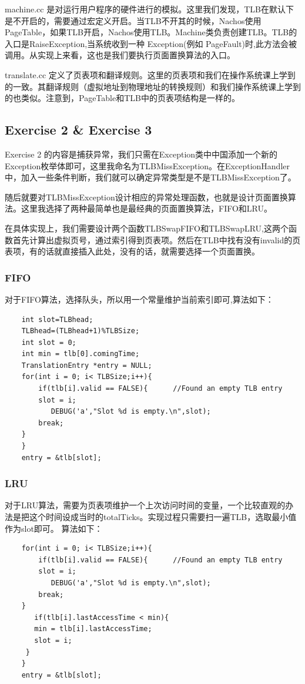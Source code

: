 \documentclass[nofonts]{ctexart}
\begin{document}
machine.cc 是对运行用户程序的硬件进行的模拟。这里我们发现，TLB在默认下是不开启的，需要通过宏定义开启。当TLB不开其的时候，Nachos使用PageTable，如果TLB开启，Nachos使用TLB。Machine类负责创建TLB。TLB的入口是RaiseException,当系统收到一种 Exception(例如 PageFault)时,此方法会被调用。从实现上来看，这也是我们要执行页面置换算法的入口。

translate.cc 定义了页表项和翻译规则。这里的页表项和我们在操作系统课上学到的一致。其翻译规则（虚拟地址到物理地址的转换规则）和我们操作系统课上学到的也类似。注意到，PageTable和TLB中的页表项结构是一样的。

\subsection*{Exercise 2 \& Exercise 3}

Exercise 2 的内容是捕获异常，我们只需在Exception类中中国添加一个新的Exception枚举体即可，这里我命名为TLBMissException。在ExceptionHandler中，加入一些条件判断，我们就可以确定异常类型是不是TLBMissException了。

随后就要对TLBMissException设计相应的异常处理函数，也就是设计页面置换算法。这里我选择了两种最简单也是最经典的页面置换算法，FIFO和LRU。

在具体实现上，我们需要设计两个函数TLBSwapFIFO和TLBSwapLRU,这两个函数首先计算出虚拟页号，通过索引得到页表项。然后在TLB中找有没有invalid的页表项，有的话就直接插入此处，没有的话，就需要选择一个页面置换。

\subsubsection*{FIFO}
对于FIFO算法，选择队头，所以用一个常量维护当前索引即可,算法如下：

\begin{lstlisting}
    int slot=TLBhead;
    TLBhead=(TLBhead+1)%TLBSize;
    int slot = 0;
    int min = tlb[0].comingTime;
    TranslationEntry *entry = NULL;		
    for(int i = 0; i< TLBSize;i++){     
        if(tlb[i].valid == FALSE){      //Found an empty TLB entry
	    slot = i;
           DEBUG('a',"Slot %d is empty.\n",slot);
	    break;
	}		
    }
    entry = &tlb[slot];

\end{lstlisting}

\subsubsection*{LRU}
对于LRU算法，需要为页表项维护一个上次访问时间的变量，一个比较直观的办法是把这个时间设成当时的totalTicks。实现过程只需要扫一遍TLB，选取最小值作为slot即可。
算法如下：
\begin{lstlisting}
    for(int i = 0; i< TLBSize;i++){     
        if(tlb[i].valid == FALSE){      //Found an empty TLB entry
	    slot = i;
           DEBUG('a',"Slot %d is empty.\n",slot);
	    break;
	}					    
       if(tlb[i].lastAccessTime < min){
	   min = tlb[i].lastAccessTime;
	   slot = i;
	 }
    }
    entry = &tlb[slot];

\end{lstlisting}
\end{document}
